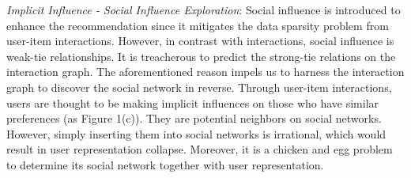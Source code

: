 \documentclass[letterpaper]{article} %
\begin{document}
\textit{Implicit Influence - Social Influence Exploration}: Social influence is introduced to enhance the recommendation since it mitigates the data sparsity problem from user-item interactions. However, in contrast with interactions, social influence is weak-tie relationships. It is treacherous to predict the strong-tie relations on the interaction graph. The aforementioned reason impels us to harness the interaction graph to discover the social network in reverse. Through user-item interactions, users are thought to be making implicit influences on those who have similar preferences (as Figure 1(c)). They are potential neighbors on social networks. However, simply inserting them into social networks is irrational, which would result in user representation collapse. Moreover, it is a chicken and egg problem to determine its social network together with user representation.
\end{document}
